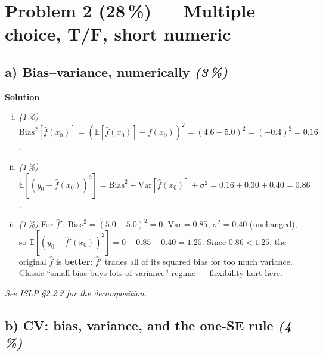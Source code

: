 \documentclass[11pt,a4paper]{article}
\newcommand{\points}[1]{\textbf{(#1\,\%)}}
\newcommand{\subpoints}[1]{\textit{(#1\,\%)}}
\newcommand{\sol}{\noindent\textbf{Solution}}
\begin{document}
\section*{Problem 2 \points{28} --- Multiple choice, T/F, short numeric}

\subsection*{a) Bias--variance, numerically \subpoints{3}}

\sol{}
\begin{enumerate}[(i)]
  \item \subpoints{1} $\mathrm{Bias}^2[\hat f(x_0)] = (\mathbb E[\hat f(x_0)] - f(x_0))^2
        = (4.6 - 5.0)^2 = (-0.4)^2 = \boxed{0.16}$.

  \item \subpoints{1}
        $\mathbb E[(y_0 - \hat f(x_0))^2]
        = \mathrm{Bias}^2 + \mathrm{Var}[\hat f(x_0)] + \sigma^2
        = 0.16 + 0.30 + 0.40 = \boxed{0.86}$.

  \item \subpoints{1} For $\hat f'$: $\mathrm{Bias}^2 = (5.0 - 5.0)^2 = 0$,
        $\mathrm{Var} = 0.85$, $\sigma^2 = 0.40$ (unchanged), so
        $\mathbb E[(y_0 - \hat f'(x_0))^2] = 0 + 0.85 + 0.40 = 1.25$.
        Since $0.86 < 1.25$, the original $\hat f$ is \textbf{better}: $\hat f'$ trades all of its
        squared bias for too much variance. Classic ``small bias buys lots of variance'' regime ---
        flexibility hurt here.
\end{enumerate}

\noindent\emph{See ISLP \S2.2.2 for the decomposition.}

\subsection*{b) CV: bias, variance, and the one-SE rule \subpoints{4}}
\end{document}
